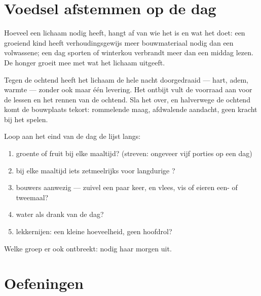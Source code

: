 \section{Voedsel afstemmen op de dag}

\begin{proposition}\label{prop:g3:balanced-diet:needs}
Hoeveel  een lichaam nodig heeft, hangt af van wie het is en wat
het doet: een groeiend kind heeft verhoudingsgewijs meer bouwmateriaal
nodig dan een volwassene; een dag sporten of winterkou verbrandt meer
 dan een middag lezen. De honger groeit mee met wat het lichaam
uitgeeft.
\end{proposition}
\admitted

\begin{example}\label{ex:g3:balanced-diet:breakfast}
Tegen de ochtend heeft het lichaam de hele nacht doorgedraaid --- hart,
adem, warmte --- zonder ook maar één levering. Het ontbijt vult de
voorraad aan voor de lessen en het rennen van de ochtend. Sla het over,
en halverwege de ochtend komt de bouwplaats tekort: rommelende maag,
afdwalende aandacht, geen kracht bij het spelen.
\end{example}

\begin{method}\label{met:g3:balanced-diet:check}
Loop aan het eind van de dag de lijst langs:
\begin{enumerate}
  \item groente of fruit bij elke maaltijd? (streven: ongeveer vijf
        porties op een dag)
  \item bij elke maaltijd iets zetmeelrijks voor langdurige ?
  \item bouwers aanwezig --- zuivel een paar keer, en vlees, vis of
        eieren een- of tweemaal?
  \item water als drank van de dag?
  \item lekkernijen: een kleine hoeveelheid, geen hoofdrol?
\end{enumerate}
Welke groep er ook ontbreekt: nodig haar morgen uit.
\end{method}

\section{Oefeningen}


